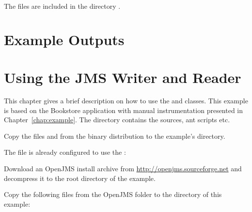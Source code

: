 The files are included in the directory \file{\aspectJBookstoreApplicationDirDistro{}/}.
      \setXMLListing
           
      

\chapter{Example \KiekerTraceAnalysis{} Outputs}


\chapter{Using the JMS Writer and Reader}

This chapter gives a brief description on how to use the  and  %
classes. This example is based on the Bookstore %
application with manual instrumentation presented in Chapter~\ref{chap:example}. %
The directory \dir{\JMSBookstoreApplicationDirDistro/} contains the %
sources, ant scripts etc. 


\begin{compactenum}
\item Copy the files \file{\mainJar} and \file{\commonsLoggingJar} from the %
binary distribution to the example's  directory.
\item The file  %
is already configured to use the :
\end{compactenum}

\setPropertiesListing


\begin{compactenum}\setcounter{enumi}{2}
\item Download an OpenJMS install archive from \url{http://openjms.sourceforge.net} %
and decompress it to the root directory of the example. 
\item Copy the following files from the OpenJMS  folder to the  directory 
   of this example:
\begin{compactenum}
\item {}
\item {}
\item {}
\item {}
\item {}
\item {}
\end{compactenum}
\end{compactenum}

